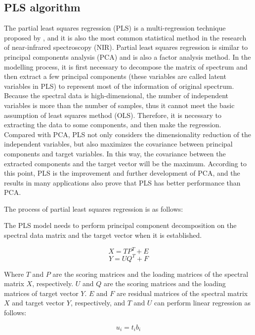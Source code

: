 \documentclass[a4paper,12pt,titlepage]{article} %
\numberwithin{equation}{section}  %
\begin{document}
	\subsection{PLS algorithm}
	\label{PLS_al}
	The partial least squares regression (PLS) is a multi-regression technique proposed by \citet{wold1984collinearity}, and it is also the most common statistical method in the research of near-infrared spectroscopy (NIR). Partial least squares regression is similar to principal components analysis (PCA) and is also a factor analysis method. In the modelling  process, it is first necessary to decompose the matrix of spectrum and then extract a few principal components (these variables are called latent variables in PLS) to represent most of the information of original spectrum. Because the spectral data is high-dimensional, the number of independent variables is more than the number of samples, thus it cannot meet the basic assumption of least squares method (OLS). Therefore, it is necessary to extracting the data to some components, and then make the regression. Compared with PCA, PLS not only considers the dimensionality reduction of the independent variables, but also maximizes the covariance between principal components and target variables. In this way, the covariance between the extracted components and the target vector will be the maximum. According to this point, PLS is the improvement and further development of PCA, and the results in many applications also prove that PLS has better performance than PCA.
	
	The process of partial least squares regression is as follows:
	
	The PLS model needs to perform principal component decomposition on the spectral data matrix and the target vector when it is established.
	
	\begin{equation}
	X=TP^T+E 
	\end{equation}
	\begin{equation}
	Y=UQ^T+F
	\end{equation}
	
	Where $T$ and $P$ are the scoring matrices and the loading matrices of the spectral matrix $X$, respectively. $U$ and $Q$ are the scoring matrices and the loading matrices of target vector $Y$. $E$ and $F$ are residual matrices of the spectral matrix $X$ and target vector $Y$, respectively, and $T$ and $U$ can perform linear regression as follows:
	
	\begin{equation}
u_i=t_ib_i
	\label{equ:ui} 
\end{equation}
\end{document}
